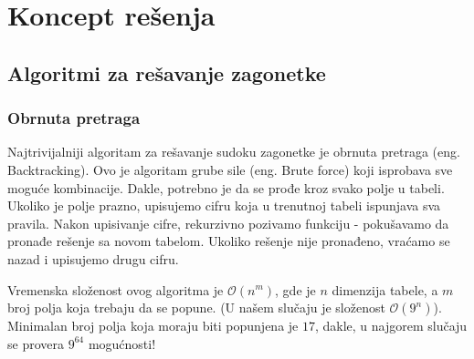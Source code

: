 \documentclass[a4paper]{article}
\begin{document}
    \section{Koncept rešenja}
    
    \subsection{Algoritmi za rešavanje zagonetke}
    \subsubsection{Obrnuta pretraga}
    Najtrivijalniji algoritam za rešavanje sudoku zagonetke je obrnuta pretraga (eng. Backtracking).
    Ovo je algoritam grube sile (eng. Brute force) koji isprobava sve moguće kombinacije. Dakle, potrebno je da se prođe kroz
    svako polje u tabeli. Ukoliko je polje prazno, upisujemo cifru koja u trenutnoj tabeli ispunjava sva pravila. Nakon upisivanje cifre, rekurzivno pozivamo funkciju 
    - pokušavamo da pronađe rešenje sa novom tabelom. Ukoliko rešenje nije pronađeno, vraćamo se nazad i upisujemo drugu cifru. 
    \par Vremenska složenost ovog algoritma je $\mathcal{O}(n ^ m)$, gde je $n$ dimenzija tabele, a $m$ broj polja koja trebaju da se popune.
    (U našem slučaju je složenost $\mathcal{O}(9^n)$). Minimalan broj polja koja
    moraju biti popunjena je $17$, dakle, u najgorem slučaju se provera $9^{64}$ mogućnosti!
    
\end{document}
